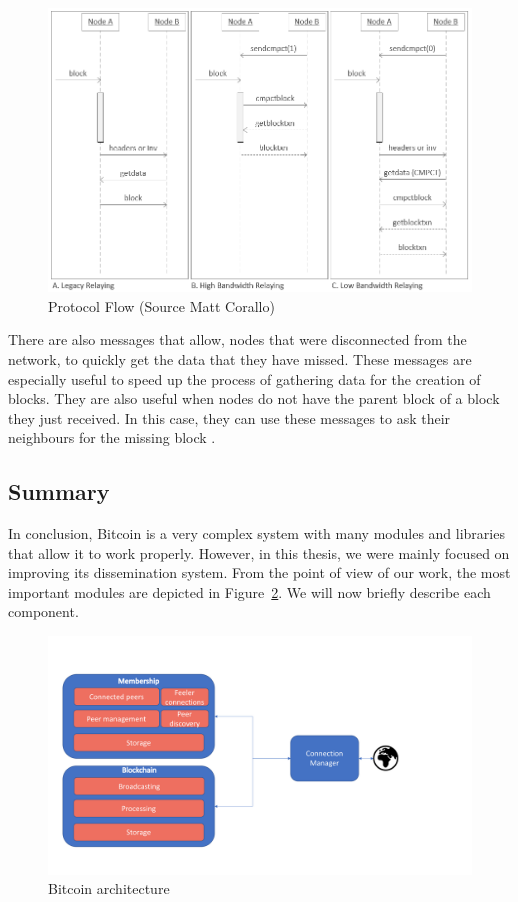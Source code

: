 \begin{figure}[h]
\centering
\includegraphics[scale=0.5]{figs/bip-152.png}
\caption{Protocol Flow (Source Matt Corallo)}
\label{fig:protocol-flow}
\end{figure}

There are also messages that allow, nodes that were disconnected from the network, to quickly get the data that they have missed. These messages are especially useful to speed up the process of gathering data for the creation of blocks. They are also useful when nodes do not have the parent block of a block they just received. In this case, they can use these messages to ask their neighbours for the missing block \cite{bitcoincorewiki}.

\subsection{Summary}
In conclusion, Bitcoin is a very complex system with many modules and libraries that allow it to work properly. However, in this thesis, we were mainly focused on improving its dissemination system. From the point of view of our work, the most important modules are depicted in Figure~\ref{fig:bitcoinoverview}. We will now briefly describe each component.

\begin{figure}[h]
\centering
\includegraphics[scale=0.4]{figs/My-Bitcoin-Core-architecture}
\caption{Bitcoin architecture}
\label{fig:bitcoinoverview}
\end{figure}

